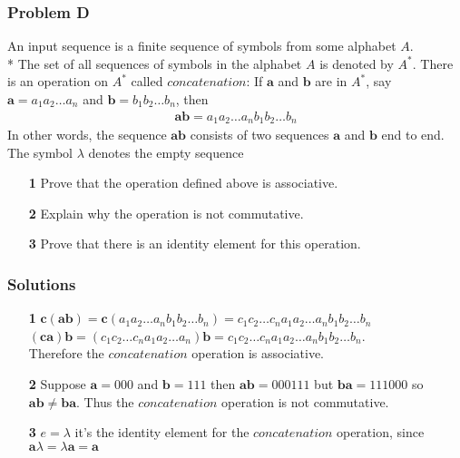 \documentclass[11pt]{article}
\begin{document}
\subsubsection*{Problem D}
An input sequence is a finite sequence of symbols from some alphabet $A$.\\*
The set of all sequences of symbols in the alphabet $A$ is denoted by $A^*$.
There is an operation on $A^*$ called $concatenation$: If $\bm{a}$ and $\bm{b}$ are in $A^*$, say $\bm{a} = a_1a_2 \ldots a_n$ and $\bm{b} = b_1b_2 \ldots b_n$, then
\begin{gather*}
\bm{ab} = a_1a_2 \ldots a_nb_1b_2 \ldots b_n
\end{gather*}
In other words, the sequence $\bm{ab}$ consists of two sequences $\bm{a}$ and $\bm{b}$ end to end.\\
The symbol $\lambda$ denotes the empty sequence
\begin{itemize}
\item [\textbf{1}] Prove that the operation defined above is associative.
\item [\textbf{2}] Explain why the operation is not commutative.
\item [\textbf{3}] Prove that there is an identity element for this operation.
\end{itemize}
\subsubsection*{Solutions}
\begin{itemize}
\item [\textbf{1}] $\bm{c}(\bm{a}\bm{b}) = \bm{c}(a_1a_2 \ldots a_nb_1b_2 \ldots b_n)=c_1c_2 \ldots c_na_1a_2 \ldots a_nb_1b_2 \ldots b_n$\\
$(\bm{c}\bm{a})\bm{b} = (c_1c_2 \ldots c_na_1a_2 \ldots a_n)\bm{b}=c_1c_2 \ldots c_na_1a_2 \ldots a_nb_1b_2 \ldots b_n$.\\
Therefore the $concatenation$ operation is associative.
\item [\textbf{2}] Suppose $\bm{a}=000$ and $\bm{b}=111$ then $\bm{ab}=000111$ but $\bm{ba}=111000$ so $\bm{ab} \neq \bm{ba}$. Thus the $concatenation$ operation is not commutative.
\item [\textbf{3}] $e=\lambda$ it's the identity element for the $concatenation$ operation, since $\bm{a} \lambda=\lambda \bm{a}=\bm{a}$    
\end{itemize}
\end{document}
